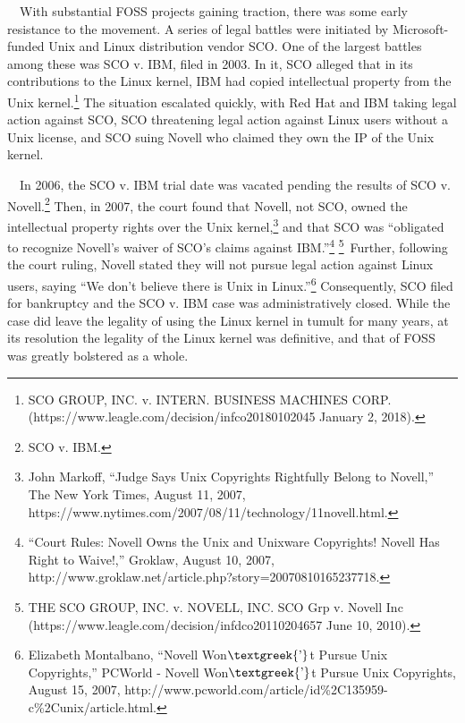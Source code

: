 \documentclass{article}
\begin{document}
\ \ With substantial FOSS projects gaining traction, there was some early resistance to the movement. A series of legal
battles were initiated by Microsoft-funded Unix and Linux distribution vendor SCO. One of the largest battles among
these was SCO v. IBM, filed in 2003. In it, SCO alleged that in its contributions to the Linux kernel, IBM had copied
intellectual property from the Unix kernel.\footnote{SCO GROUP, INC. v. INTERN. BUSINESS MACHINES CORP.
(https://www.leagle.com/decision/infco20180102045 January 2, 2018).} The situation escalated quickly, with Red Hat and
IBM taking legal action against SCO, SCO threatening legal action against Linux users without a Unix license, and SCO
suing Novell who claimed they own the IP of the Unix kernel.

\ \ In 2006, the SCO v. IBM trial date was vacated pending the results of SCO v. Novell.\footnote{SCO v. IBM.} Then, in
2007, the court found that Novell, not SCO, owned the intellectual property rights over the Unix kernel,\footnote{John
Markoff, “Judge Says Unix Copyrights Rightfully Belong to Novell,” The New York Times, August 11, 2007,
https://www.nytimes.com/2007/08/11/technology/11novell.html.} and that SCO was “obligated to recognize Novell's waiver
of SCO's claims against IBM.”\footnote{“Court Rules: Novell Owns the Unix and Unixware Copyrights! Novell Has Right to
Waive!,” Groklaw, August 10, 2007, http://www.groklaw.net/article.php?story=20070810165237718.} \footnote{THE SCO
GROUP, INC. v. NOVELL, INC. SCO Grp v. Novell Inc (https://www.leagle.com/decision/infdco20110204657 June 10,
2010).}\ Further, following the court ruling, Novell stated they will not pursue legal action against Linux users,
saying “We don't believe there is Unix in Linux.”\footnote{Elizabeth Montalbano, “Novell Won$\text{\textgreek{’}}$t
Pursue Unix Copyrights,” PCWorld - Novell Won$\text{\textgreek{’}}$t Pursue Unix Copyrights, August 15, 2007,
http://www.pcworld.com/article/id\%2C135959-c\%2Cunix/article.html.} Consequently, SCO filed for bankruptcy and the SCO
v. IBM case was administratively closed. While the case did leave the legality of using the Linux kernel in tumult for
many years, at its resolution the legality of the Linux kernel was definitive, and that of FOSS was greatly bolstered
as a whole.
\end{document}
